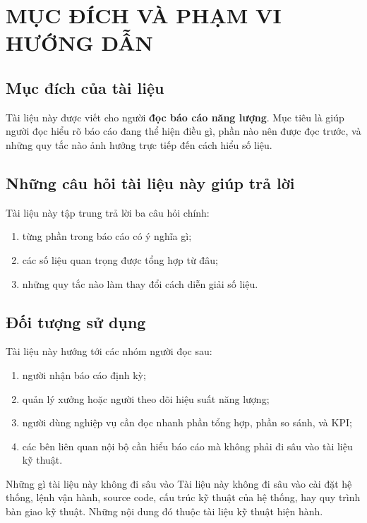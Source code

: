 \chapter{MỤC ĐÍCH VÀ PHẠM VI HƯỚNG DẪN}

\section{Mục đích của tài liệu}

Tài liệu này được viết cho người \textbf{đọc báo cáo năng lượng}. Mục tiêu là giúp người đọc hiểu rõ báo cáo đang thể hiện điều gì, phần nào nên được đọc trước, và những quy tắc nào ảnh hưởng trực tiếp đến cách hiểu số liệu.

\section{Những câu hỏi tài liệu này giúp trả lời}

Tài liệu này tập trung trả lời ba câu hỏi chính:

\begin{enumerate}[label=-]
\item từng phần trong báo cáo có ý nghĩa gì;
\item các số liệu quan trọng được tổng hợp từ đâu;
\item những quy tắc nào làm thay đổi cách diễn giải số liệu.
\end{enumerate}

\section{Đối tượng sử dụng}

Tài liệu này hướng tới các nhóm người đọc sau:

\begin{enumerate}[label=-]
\item người nhận báo cáo định kỳ;
\item quản lý xưởng hoặc người theo dõi hiệu suất năng lượng;
\item người dùng nghiệp vụ cần đọc nhanh phần tổng hợp, phần so sánh, và KPI;
\item các bên liên quan nội bộ cần hiểu báo cáo mà không phải đi sâu vào tài liệu kỹ thuật.
\end{enumerate}

\begin{ReaderNote}{Những gì tài liệu này không đi sâu vào}
Tài liệu này không đi sâu vào cài đặt hệ thống, lệnh vận hành, source code, cấu trúc kỹ thuật của hệ thống, hay quy trình bàn giao kỹ thuật. Những nội dung đó thuộc tài liệu kỹ thuật hiện hành.
\end{ReaderNote}

